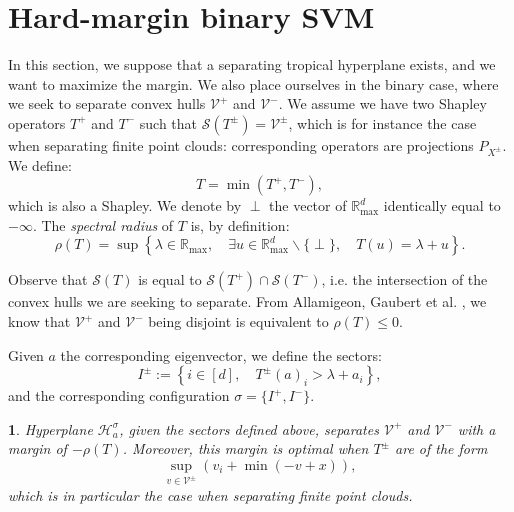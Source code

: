 \documentclass[oneside,english,a4paper]{amsart}
\numberwithin{equation}{section}
\numberwithin{figure}{section}
\theoremstyle{plain}
\theoremstyle{definition}
\theoremstyle{plain}
\newtheorem{prop}[thm]{\protect\propositionname}
\theoremstyle{remark}
\theoremstyle{plain}
\theoremstyle{definition}
\theoremstyle{definition}
\providecommand{\propositionname}{Proposition}
\begin{document}
\section{Hard-margin binary SVM}

In this section, we suppose that a separating tropical hyperplane
exists, and we want to maximize the margin. We also place ourselves
in the binary case, where we seek to separate convex hulls $\mathcal{V}^{+}$
and $\mathcal{V}^{-}$. We assume we have two Shapley operators $T^{+}$
and $T^{-}$ such that $\mathcal{S}(T^{\pm})=\mathcal{V}^{\pm}$,
which is for instance the case when separating finite point clouds:
corresponding operators are projections $P_{X^{\pm}}$. We define:
\[
T=\min(T^{+},T^{-}),
\]
which is also a Shapley. We denote by $\perp$ the vector of $\mathbb{R}_{\max}^{d}$
identically equal to $-\infty$. The \emph{spectral radius} of $T$
is, by definition:
\[
\rho(T)=\sup\left\{\lambda\in\mathbb{R}_{\max},\quad\exists u\in\mathbb{R}_{\max}^{d}\backslash\{\perp\},\quad T(u)=\lambda+u\right\}.
\]

Observe that $\mathcal{S}(T)$ is equal to $\mathcal{S}(T^{+})\cap\mathcal{S}(T^{-})$,
i.e. the intersection of the convex hulls we are seeking to separate.
From Allamigeon, Gaubert et al. \cite{Allamigeon2018}, we know that $\mathcal{V}^{+}$
and $\mathcal{V^{-}}$ being disjoint is equivalent to $\rho(T)\le0$.

Given $a$ the corresponding eigenvector, we define the sectors:
\[
I^{\pm}:=\left\{i\in[d],\quad T^{\pm}(a)_{i}>\lambda+a_{i}\right\},
\]
and the corresponding configuration $\sigma=\{I^{+},I^{-}\}$.
\begin{prop}
Hyperplane $\mathcal{H}_{a}^{\sigma}$, given the sectors defined
above, separates $\mathcal{V}^{+}$ and $\mathcal{V}^{-}$ with a
margin of $-\rho(T)$. Moreover, this margin is optimal when $T^{\pm}$
are of the form
\[
\sup_{v\in\mathcal{V}^{\pm}}\left(v_{i}+\min(-v+x)\right),
\]
which is in particular the case when separating finite point clouds.
\end{prop}
\end{document}

